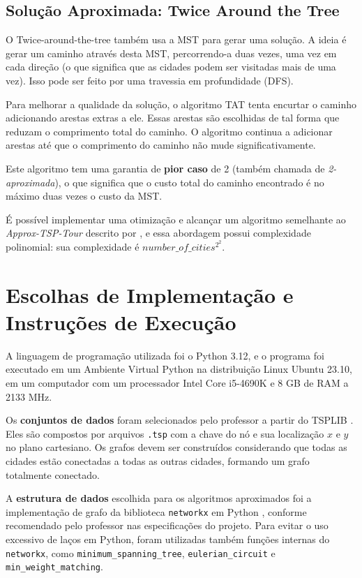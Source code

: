 \subsection{Solução Aproximada: Twice Around the Tree} \label{sec:twice_explanation}

O Twice-around-the-tree também usa a MST para gerar uma solução. A ideia é gerar um caminho 
através desta MST, percorrendo-a duas vezes, uma vez em cada direção (o que significa que as cidades 
podem ser visitadas mais de uma vez). Isso pode ser feito por uma travessia em profundidade (DFS).

Para melhorar a qualidade da solução, o algoritmo TAT tenta encurtar o 
caminho adicionando arestas extras a ele. Essas arestas são escolhidas de tal forma que reduzam 
o comprimento total do caminho. O algoritmo continua a adicionar arestas até que o comprimento 
do caminho não mude significativamente.

Este algoritmo tem uma garantia de \textbf{pior caso} de 2 (também chamada de \textit{2-aproximada}), o que significa 
que o custo total do caminho encontrado é no máximo duas vezes o custo da MST.

É possível implementar uma otimização e alcançar um algoritmo semelhante ao \textit{Approx-TSP-Tour} 
descrito por \cite{cormen}, e essa abordagem possui complexidade polinomial: sua complexidade é $number\_of\_cities^2^2$.


\section{Escolhas de Implementação e Instruções de Execução} \label{sec:implementation}

A linguagem de programação utilizada foi o Python 3.12, e o programa foi executado 
em um Ambiente Virtual Python na distribuição Linux Ubuntu 23.10, em um computador com um 
processador Intel Core i5-4690K e 8 GB de RAM a 2133 MHz.

Os \textbf{conjuntos de dados} foram selecionados pelo professor a partir do TSPLIB \cite{dataset_lib}. Eles são 
compostos por arquivos \texttt{.tsp} com a chave do nó e sua localização $x$ e $y$ no plano cartesiano. 
Os grafos devem ser construídos considerando que todas as cidades estão conectadas a todas as outras cidades, formando 
um grafo totalmente conectado.

A \textbf{estrutura de dados} escolhida para os algoritmos aproximados foi a implementação de grafo 
da biblioteca \texttt{networkx} em Python \cite{networkx_docs}, conforme recomendado pelo 
professor nas especificações do projeto. Para evitar o uso excessivo de laços em Python, 
foram utilizadas também funções internas do \texttt{networkx}, como \texttt{minimum\_spanning\_tree}, 
\texttt{eulerian\_circuit} e \texttt{min\_weight\_matching}.

